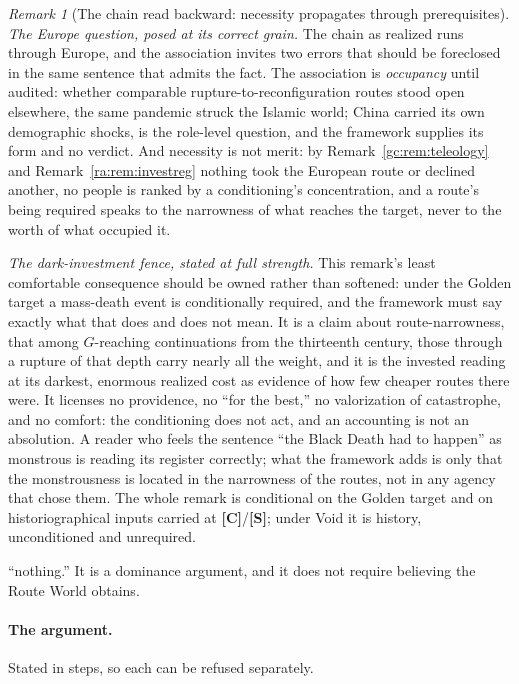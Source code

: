 \documentclass[11pt]{article}
\numberwithin{equation}{section}
\theoremstyle{plain}
\theoremstyle{definition}
\theoremstyle{remark}
\newtheorem{remark}[theorem]{Remark}
\begin{document}
\begin{remark}[The chain read backward: necessity propagates through
prerequisites]
\emph{The Europe question, posed at its correct grain.} The chain as
realized runs through Europe, and the association invites two errors
that should be foreclosed in the same sentence that admits the fact.
The association is \emph{occupancy} until audited: whether comparable
rupture-to-reconfiguration routes stood open elsewhere, the same
pandemic struck the Islamic world; China carried its own
demographic shocks, is the role-level question, and the framework
supplies its form and no verdict. And necessity is not merit:
by Remark~\ref{gc:rem:teleology} and Remark~\ref{ra:rem:investreg}
nothing took the European route or declined another, no people is
ranked by a conditioning's concentration, and a route's being
required speaks to the narrowness of what reaches the target, never
to the worth of what occupied it.

\emph{The dark-investment fence, stated at full strength.} This
remark's least comfortable consequence should be owned rather than
softened: under the Golden target a mass-death event is conditionally
required, and the framework must say exactly what that does and does
not mean. It is a claim about route-narrowness, that among
$G$-reaching continuations from the thirteenth century, those through
a rupture of that depth carry nearly all the weight, and it is the
invested reading at its darkest, enormous realized cost as evidence
of how few cheaper routes there were. It licenses no providence, no
``for the best,'' no valorization of catastrophe, and no comfort:
the conditioning does not act, and an accounting is not an
absolution. A reader who feels the sentence ``the Black Death had to
happen'' as monstrous is reading its register correctly; what the
framework adds is only that the monstrousness is located in the
narrowness of the routes, not in any agency that chose them. The
whole remark is conditional on the Golden target and on
historiographical inputs carried at \textbf{[C]}/\textbf{[S]};
under Void it is history, unconditioned and unrequired.
\end{remark}

``nothing.'' It is a dominance argument, and it does not require
believing the Route World obtains.

\paragraph{The argument.} Stated in steps, so each can be refused
separately.
\end{document}
